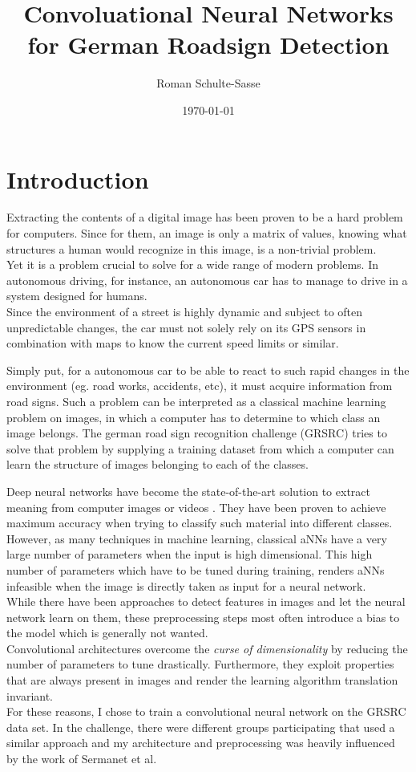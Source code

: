 \documentclass[11pt,a4paper]{article}
\title{Convoluational Neural Networks for German Roadsign Detection}
\author{Roman Schulte-Sasse}
\date{\today}
\begin{document}
\maketitle
\clearpage


\section{Introduction}
Extracting the contents of a digital image has been proven to be a hard problem for computers. Since for them, an image is only a matrix of values, knowing what structures a human would recognize in this image, is a non-trivial problem.\\
Yet it is a problem crucial to solve for a wide range of modern problems. In autonomous driving, for instance, an autonomous car has to manage to drive in a system designed for humans.\\
Since the environment of a street is highly dynamic and subject to often unpredictable changes, the car must not solely rely on its GPS sensors in combination with maps to know the current speed limits or similar.

Simply put, for a autonomous car to be able to react to such rapid changes in the environment (eg. road works, accidents, etc), it must acquire information from road signs.
Such a problem can be interpreted as a classical machine learning problem on images, in which a computer has to determine to which class an image belongs.
The german road sign recognition challenge (GRSRC) tries to solve that problem by supplying a training dataset from which a computer can learn the structure of images belonging to each of the classes.

Deep neural networks have become the state-of-the-art solution to extract meaning from computer images or videos . They have been proven to achieve maximum accuracy when trying to classify such material into different classes. However, as many techniques in machine learning, classical aNNs have a very large number of parameters when the input is high dimensional. This high number of parameters which have to be tuned during training, renders aNNs infeasible when the image is directly taken as input for a neural network.\\
While there have been approaches to detect features in images and let the neural network learn on them, these preprocessing steps most often introduce a bias to the model which is generally not wanted. \\
Convolutional architectures overcome the \textit{curse of dimensionality} by reducing the number of parameters to tune drastically. Furthermore, they exploit properties that are always present in images and render the learning algorithm translation invariant.\\
For these reasons, I chose to train a convolutional neural network on the GRSRC data set. In the challenge, there were different groups participating that used a similar approach and my architecture and preprocessing was heavily influenced by the work of Sermanet et al. \cite{sermanet2011traffic}
\end{document}
